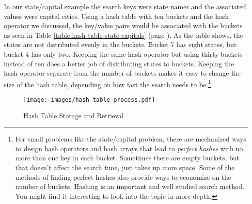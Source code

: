 In our state/capital example the search keys were state names and the
associated values were capital cities.
Using a hash table with ten buckets and the hash operator
we discussed, the key/value pairs would be associated with the
buckets as seen in
Table \ref{table:hash-table-state-capitals}
(page \pageref{table:hash-table-state-capitals}).
As the table shows, the states are not distributed evenly in the
buckets. Bucket 7 has
eight states, but bucket 4 has only two.
Keeping the same hash operator but using thirty buckets
instead of ten does a better job of distributing states to buckets.
Keeping the hash operator separate from the number of buckets
makes it easy to change the size of the
hash table, depending on how fast the search needs
to be.\footnote{For small problems like the state/capital problem,
there are mechanized ways to design hash operators and
hash arrays that lead to \emph{perfect hashes} with no
more than one key in each bucket. Sometimes there are
empty buckets, but that doesn't affect the search time,
just takes up more space. Some of the methods of
finding perfect hashes also provide ways to economize
on the number of buckets.
Hashing is an important and well studied search method.
You might find it interesting to look into the topic in more depth.}

\begin{figure}
\begin{center}
\texttt{[image: images/hash-table-process.pdf]}
\end{center}
\caption{Hash Table Storage and Retrieval}
\label{fig:hash-table-process}
\end{figure}

